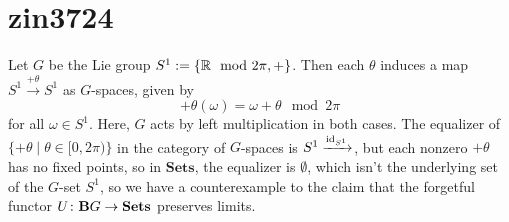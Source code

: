 \section{zin3724}
Let $G$ be the Lie group $S^1:=\left\{ \mathbb{R}\mod2\pi,+ \right\}$. Then each $\theta$ induces a map $S^1\xrightarrow{+\theta} S^1$ as $G$-spaces, given by
\[+\theta(\omega)=\omega+\theta\mod{2\pi}\]
for all $\omega\in S^1$. Here, $G$ acts by left multiplication in both cases. The equalizer of $\{+\theta\mid\theta\in[0,2\pi)\}$ in the category of $G$-spaces is $S^1\xrightarrow{\operatorname{\operatorname{id}}_{S^1}}$, but each nonzero $+\theta$ has no fixed points, so in $\textbf{Sets}$, the equalizer is $\emptyset$, which isn't the underlying set of the $G$-set $S^1$, so we have a counterexample to the claim that the forgetful functor $U\colon\textbf{B}G\rightarrow\textbf{Sets}$ preserves limits.
